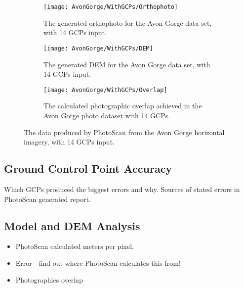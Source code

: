 \begin{figure}
    \centering
    \begin{subfigure}[b]{0.3\textwidth}
        \texttt{[image: AvonGorge/WithGCPs/Orthophoto]}
        \caption{The generated orthophoto for the Avon Gorge data set, with 14
        GCPs input.}
        \label{img:avon-gorge/with-gcps/orthophoto}
    \end{subfigure}
    \begin{subfigure}[b]{0.3\textwidth}
        \texttt{[image: AvonGorge/WithGCPs/DEM]}
        \caption{The generated DEM for the Avon Gorge data set, with 14 GCPs
        input.}
        \label{img:avon-gorge/with-gcps/dem}
    \end{subfigure}
    \begin{subfigure}[b]{0.3\textwidth}
        \texttt{[image: AvonGorge/WithGCPs/Overlap]}
        \caption{The calculated photographic overlap achieved in the Avon Gorge
        photo dataset with 14 GCPs.}
        \label{img:avon-gorge/with-gcps/overlap}
    \end{subfigure}
    \caption{The data produced by PhotoScan from the Avon Gorge horizontal
    imagery, with 14 GCPs input.}
    \label{img:avon-gorge/with-gcps}
\end{figure}

\subsection{Ground Control Point Accuracy}

Which GCPs produced the biggest errors and why. Sources of stated errors in
PhotoScan generated report.

\subsection{Model and DEM Analysis}

\begin{itemize}

    \item PhotoScan calculated meters per pixel.

    \item Error - find out where PhotoScan calculates this from!

    \item Photographics overlap

\end{itemize}
